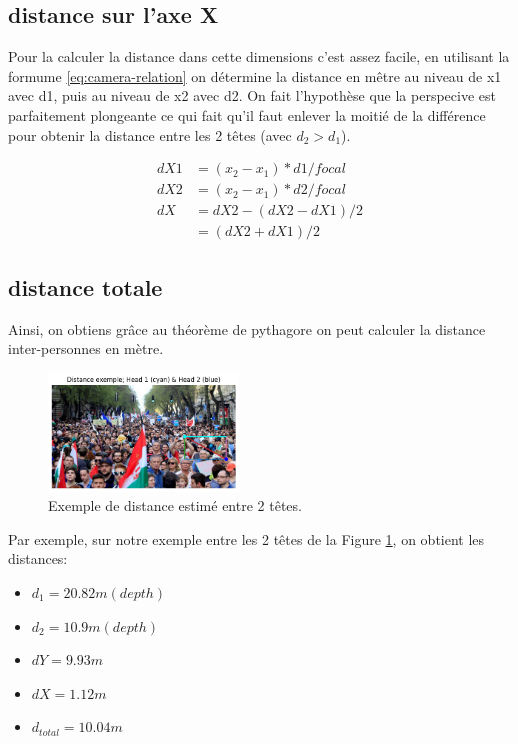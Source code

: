 \subsection{distance sur l'axe X}

Pour la calculer la distance dans cette dimensions c'est assez facile, en utilisant la formume \ref{eq:camera-relation} on détermine la distance en mêtre au niveau de x1 avec d1, puis au niveau de x2 avec d2.
On fait l'hypothèse que la perspecive est parfaitement plongeante ce qui fait qu'il faut enlever la moitié de la différence pour obtenir la distance entre les 2 têtes (avec $d_2>d_1$).

\begin{align}
    dX1 &= (x_2-x_1) * d1 / focal \\
    dX2 &= (x_2-x_1) * d2 / focal \\
    dX  &= dX2 - (dX2-dX1)/2 \\
        &= (dX2 + dX1) /2
\end{align}

\subsection{distance totale}

Ainsi, on obtiens grâce au théorème de pythagore on peut calculer la distance inter-personnes en mètre.

\begin{figure}[h!]
    \centering
    \includegraphics[width=0.45\textwidth]{images/exemple_dist_estimation.png}
    \caption{Exemple de distance estimé entre 2 têtes.}
    \label{fig:distance-estimation}
\end{figure}

Par exemple, sur notre exemple entre les 2 têtes de la Figure \ref{fig:distance-estimation}, on obtient les distances:

\begin{itemize}
    \item $d_1 = 20.82m (depth)$
    \item $d_2 = 10.9m (depth)$
    \item $dY = 9.93m$
    \item $dX = 1.12m$
    \item $d_{total} = 10.04m$
\end{itemize}

